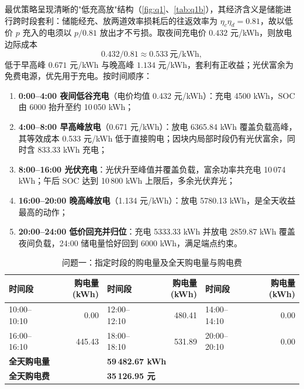 \documentclass[withoutpreface,bwprint]{cumcmthesis}
\begin{document}
最优策略呈现清晰的"低充高放"结构（\cref{fig:q1}、\cref{tab:q1b}），其经济含义是储能进行跨时段套利：储能经充、放两道效率损耗后的往返效率为 $\eta_c\eta_d=0.81$，故以低价 $p$ 充入的电须以 $p/0.81$ 放出才不亏损。取夜间充电价 $0.432$ 元/kWh，则放电边际成本
\begin{equation}
0.432/0.81\approx 0.533\ \text{元/kWh},\label{eq:q1margin}
\end{equation}
低于早高峰 $0.671$ 元/kWh 与晚高峰 $1.134$ 元/kWh，套利有正收益；光伏富余为免费电源，优先用于充电。按时间顺序：



\begin{enumerate}[label=(\arabic*), leftmargin=2.2em, itemsep=1pt]
\item \textbf{0:00--4:00 夜间低谷充电}（电价均值 0.432 元/kWh）：充电 4500 kWh，SOC 由 6000 抬升至约 10\,050 kWh；
\item \textbf{4:00--8:00 早高峰放电}（0.671 元/kWh）：放电 6365.84 kWh 覆盖负载高峰，其等效成本 0.533 元/kWh 低于直接购电；因块内局部时段仍有光伏富余，同时含 833.33 kWh 充电；
\item \textbf{8:00--16:00 光伏充电}：光伏升至峰值并覆盖负载，富余功率共充电 10\,074 kWh；午后 SOC 达到 10\,800 kWh 上限后，多余光伏弃光；
\item \textbf{16:00--20:00 晚高峰放电}（1.134 元/kWh）：放电 5780.13 kWh，是全天收益最高的动作；
\item \textbf{20:00--24:00 低价回充并归位}：充电 5333.33 kWh 并放电 2859.87 kWh 覆盖夜间负载，24:00 储电量恰好回到 6000 kWh，满足端点约束。
\end{enumerate}

\begin{table}[htbp]
\centering
\caption{问题一：指定时段的购电量及全天购电量与购电费}
\label{tab:q1a}
\begin{tabular}{@{}lrlrlr@{}}
\toprule
时间段 & 购电量(kWh) & 时间段 & 购电量(kWh) & 时间段 & 购电量(kWh) \\
\midrule
10:00--10:10 & 0.00 & 12:00--12:10 & 480.41 & 14:00--14:10 & 0.00 \\
16:00--16:10 & 445.43 & 18:00--18:10 & 531.89 & 20:00--20:10 & 0.00 \\
\midrule
\multicolumn{2}{l}{\textbf{全天购电量}} & \multicolumn{4}{l}{\textbf{59\,482.67 kWh}} \\
\multicolumn{2}{l}{\textbf{全天购电费}} & \multicolumn{4}{l}{\textbf{35\,126.95 元}} \\
\bottomrule
\end{tabular}
\end{table}
\end{document}
